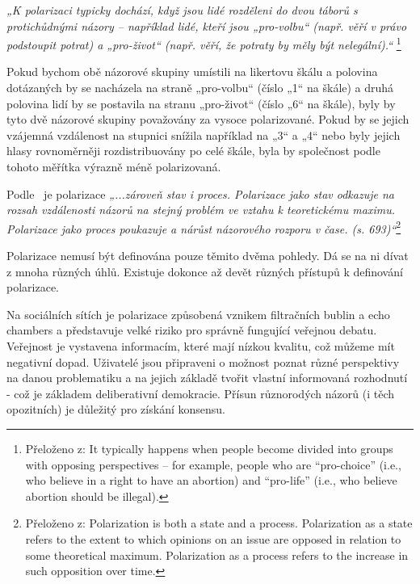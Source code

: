     \setlength\parskip{5mm}
    
    \textit{„K polarizaci typicky dochází, když jsou lidé rozděleni do dvou táborů s protichůdnými názory – například lidé, kteří jsou „pro-volbu“ (např. věří v právo podstoupit potrat) a „pro-život“ (např. věří, že potraty by měly být nelegální).“} \footnote{Přeloženo z: It typically happens when people become divided into groups with opposing perspectives –
    for example, people who are “pro-choice” (i.e., who believe in a right to have an abortion) and “pro-life” (i.e.,
    who believe abortion should be illegal).}~\citep{Nelimarkka} 
    
    Pokud bychom obě názorové skupiny umístili na likertovu škálu a polovina dotázaných by se nacházela na straně „pro-volbu“  (číslo „1“ na škále) a druhá polovina lidí by se postavila na stranu „pro-život“ (číslo „6“ na škále), byly by tyto dvě názorové skupiny považovány za vysoce polarizované. Pokud by se jejich vzájemná vzdálenost na stupnici snížila například na „3“ a „4“ nebo byly jejich hlasy rovnoměrněji rozdistribuovány po celé škále, byla by společnost podle tohoto měřítka výrazně méně polarizovaná.~\citep{Davies}
    
    Podle~\cite{DiMaggio} je polarizace \textit{„...zároveň stav i proces. Polarizace jako stav odkazuje na rozsah vzdálenosti názorů na stejný problém ve vztahu k teoretickému maximu. Polarizace jako proces poukazuje a nárůst názorového rozporu v čase. (s. 693)“}\footnote{Přeloženo z: Polarization is both a state and a process. Polarization as a state refers to the extent to which opinions on an issue are opposed in relation to some theoretical maximum. Polarization as a process refers to the increase in such opposition over time.} 
    
    Polarizace nemusí být definována pouze těmito dvěma pohledy. Dá se na ni dívat z mnoha různých úhlů. Existuje dokonce až devět různých přístupů k definování polarizace.~\citep{Bramson16} 
    
    \setlength\parskip{0mm}
    
    Na sociálních sítích je polarizace způsobená vznikem filtračních bublin a echo chambers a představuje velké riziko pro správně fungující veřejnou debatu.~\citep{Foth} Veřejnost je vystavena informacím, které mají nízkou kvalitu, což můžeme mít negativní dopad. Uživatelé jsou připraveni o možnost poznat různé perspektivy na danou problematiku a na jejich základě tvořit vlastní informovaná rozhodnutí - což je základem deliberativní demokracie. Přísun různorodých názorů (i těch opozitních) je důležitý pro získání konsensu.~\citep{bozdag}
    
